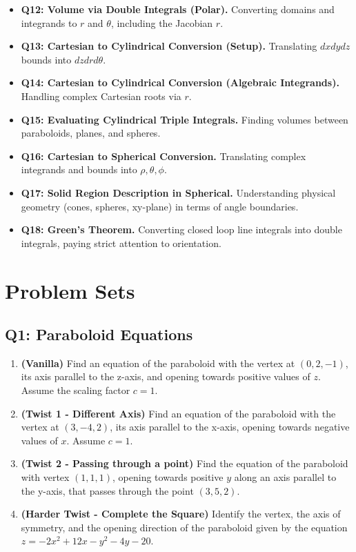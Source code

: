 \documentclass[11pt]{article}
\begin{document}
\begin{itemize}
    \item \textbf{Q12: Volume via Double Integrals (Polar).} Converting domains and integrands to $r$ and $\theta$, including the Jacobian $r$.
    \item \textbf{Q13: Cartesian to Cylindrical Conversion (Setup).} Translating $dx dy dz$ bounds into $dz dr d\theta$.
    \item \textbf{Q14: Cartesian to Cylindrical Conversion (Algebraic Integrands).} Handling complex Cartesian roots via $r$.
    \item \textbf{Q15: Evaluating Cylindrical Triple Integrals.} Finding volumes between paraboloids, planes, and spheres.
    \item \textbf{Q16: Cartesian to Spherical Conversion.} Translating complex integrands and bounds into $\rho, \theta, \phi$.
    \item \textbf{Q17: Solid Region Description in Spherical.} Understanding physical geometry (cones, spheres, xy-plane) in terms of angle boundaries.
    \item \textbf{Q18: Green's Theorem.} Converting closed loop line integrals into double integrals, paying strict attention to orientation.
\end{itemize}

\newpage
\section{Problem Sets}

\subsection{Q1: Paraboloid Equations}
\begin{enumerate}[label=\textbf{1\alph*.}]
    \item \textbf{(Vanilla)} Find an equation of the paraboloid with the vertex at $(0, 2, -1)$, its axis parallel to the z-axis, and opening towards positive values of $z$. Assume the scaling factor $c = 1$.
    \item \textbf{(Twist 1 - Different Axis)} Find an equation of the paraboloid with the vertex at $(3, -4, 2)$, its axis parallel to the x-axis, opening towards negative values of $x$. Assume $c = 1$.
    \item \textbf{(Twist 2 - Passing through a point)} Find the equation of the paraboloid with vertex $(1, 1, 1)$, opening towards positive $y$ along an axis parallel to the y-axis, that passes through the point $(3, 5, 2)$.
    \item \textbf{(Harder Twist - Complete the Square)} Identify the vertex, the axis of symmetry, and the opening direction of the paraboloid given by the equation $z = -2x^2 + 12x - y^2 - 4y - 20$.
\end{enumerate}
\end{document}
